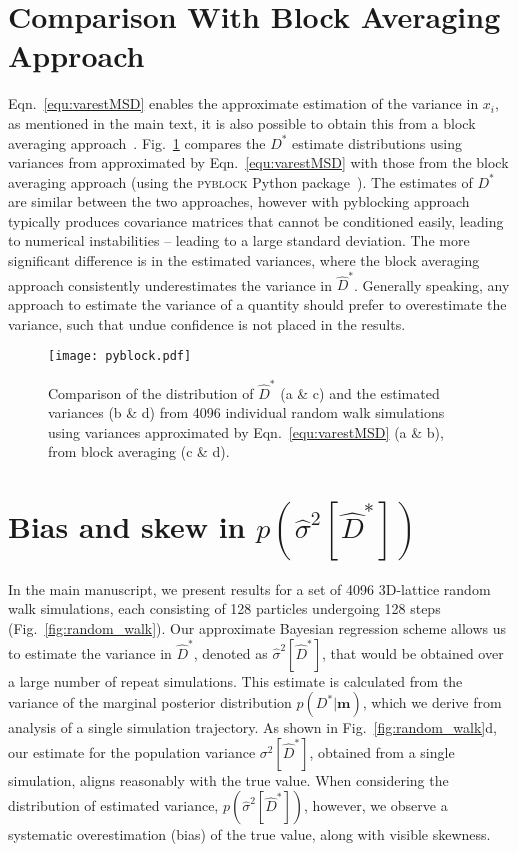 \documentclass[reprint,superscriptaddress,nobibnotes,amsmath,amssymb,aps,prx,hidelinks,linenumbers]{revtex4-2}
\newcommand{\oMSDi}{\ensuremath{x_i}}
\newcommand{\model}{\bm{m}}
\newcommand{\prob}[1]{\ensuremath{p(#1)}}
\newcommand{\Dest}{\ensuremath{\widehat{D}^*}}
\newcommand{\D}{\ensuremath{D^*}}
\newcommand{\var}[1]{\ensuremath{\sigma^2[#1]}}
\newcommand{\varest}[1]{\ensuremath{\widehat{\sigma}^2[#1]}}
\begin{document}
\section{Comparison With Block Averaging Approach}
\label{sec:block}
Eqn.~\ref{equ:varestMSD} enables the approximate estimation of the variance in $\oMSDi$, as mentioned in the main text, it is also possible to obtain this from a block averaging approach~\cite{flyvbjerg_error_1989,frenkel_understanding_2023}.
Fig.~\ref{fig:pyblock} compares the $\D$ estimate distributions using variances from approximated by Eqn.~\ref{equ:varestMSD} with those from the block averaging approach (using the \textsc{pyblock} Python package~\cite{spencer_pyblock_2020}).
The estimates of $\D$ are similar between the two approaches, however with pyblocking approach typically produces covariance matrices that cannot be conditioned easily, leading to numerical instabilities -- leading to a large standard deviation.
The more significant difference is in the estimated variances, where the block averaging approach consistently underestimates the variance in $\Dest$. 
Generally speaking, any approach to estimate the variance of a quantity should prefer to overestimate the variance, such that undue confidence is not placed in the results. 

\begin{figure}
    \centering
    \texttt{[image: pyblock.pdf]}
    \caption{Comparison of the distribution of $\Dest$ (a \& c) and the estimated variances (b \& d) from 4096 individual random walk simulations using variances approximated by Eqn.~\ref{equ:varestMSD} (a \& b), from block averaging (c \& d).}
    \label{fig:pyblock}
\end{figure}

\section{Bias and skew in $\prob{\varest{\Dest}}$}
\label{sec:skew}
In the main manuscript, we present results for a set of \num{4096} 3D-lattice random walk simulations, each consisting of \num{128} particles undergoing \num{128} steps (Fig.~\ref{fig:random_walk}).
Our approximate Bayesian regression scheme allows us to estimate the variance in $\Dest$, denoted as $\varest{\Dest}$, that would be obtained over a large number of repeat simulations.
This estimate is calculated from the variance of the marginal posterior distribution $\prob{\D|\model}$, which we derive from analysis of a single simulation trajectory.
As shown in Fig.~\ref{fig:random_walk}d, our estimate for the population variance $\var{\Dest}$, obtained from a single simulation, aligns reasonably with the true value.
When considering the distribution of estimated variance, $\prob{\varest{\Dest}}$, however, we observe a systematic overestimation (bias) of the true value, along with visible skewness.
\end{document}
